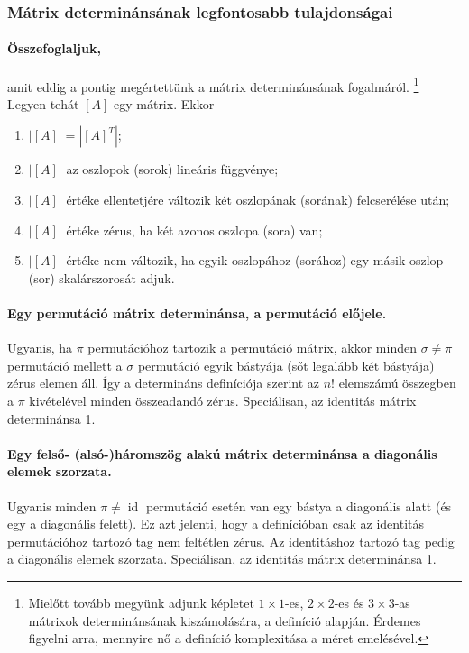 \documentclass[9pt, a4paper, showtrims]{memoir}
\theoremstyle{plain}
\theoremstyle{remark}
\theoremstyle{definition}
\DeclareMathOperator{\id}{id}
\begin{document}
\subsubsection{Mátrix determinánsának legfontosabb tulajdonságai}

\paragraph{Összefoglaljuk,} amit eddig a pontig megértettünk a mátrix determinánsának fogalmáról.
\footnote{
Mielőtt tovább megyünk adjunk képletet $1\times 1$-es, 
$2\times 2$-es és $3\times 3$-as mátrixok determinánsának kiszámolására, a definíció alapján.
Érdemes figyelni arra, mennyire nő a definíció komplexitása a méret emelésével.
}
Legyen tehát $[A]$ egy mátrix. Ekkor
\begin{enumerate}
    \item $|[A]|=|[A]^T|$;
    \item $|[A]|$ az oszlopok (sorok) lineáris függvénye;
    \item $|[A]|$ értéke ellentetjére változik két oszlopának (sorának) felcserélése után;
    \item $|[A]|$ értéke zérus, ha két azonos oszlopa (sora) van;
    \item $|[A]|$ értéke nem változik, ha egyik oszlopához (sorához) egy másik oszlop (sor) skalárszorosát adjuk.
\end{enumerate}

\paragraph{Egy permutáció mátrix determinánsa, a permutáció előjele.}
Ugyanis, ha $\pi$ permutációhoz tartozik a permutáció mátrix, akkor minden $\sigma\neq\pi$ permutáció mellett
a $\sigma$ permutáció egyik bástyája (sőt legalább két bástyája) zérus elemen áll. 
Így a determináns definíciója szerint az $n!$ elemszámú összegben a $\pi$ kivételével minden összeadandó zérus.
Speciálisan, az identitás mátrix determinánsa 1.

\paragraph{Egy felső- (alsó-)háromszög alakú mátrix determinánsa a diagonális elemek szorzata.}
Ugyanis minden $\pi\neq\id$ permutáció esetén van egy bástya a diagonális alatt (és egy a diagonális felett).
Ez azt jelenti, hogy a definícióban csak az identitás permutációhoz tartozó tag nem feltétlen zérus.
Az identitáshoz tartozó tag pedig a diagonális elemek szorzata.
Speciálisan, az identitás mátrix determinánsa 1.
\end{document}
